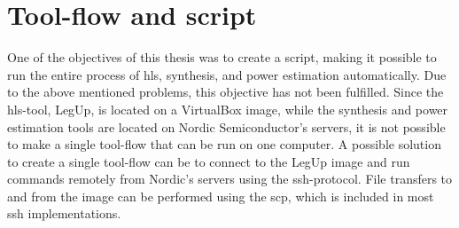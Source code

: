 \section{Tool-flow and script}
One of the objectives of this thesis was to create a script, making it possible to run the entire process of \gls{hls}, synthesis, and power estimation automatically. Due to the above mentioned problems, this objective has not been fulfilled. Since the \gls{hls}-tool, LegUp, is located on a VirtualBox image, while the synthesis and power estimation tools are located on Nordic Semiconductor's servers, it is not possible to make a single tool-flow that can be run on one computer. A possible solution to create a single tool-flow can be to connect to the LegUp image and run commands remotely from Nordic's servers using the \gls{ssh}-protocol. File transfers to and from the image can be performed using the \gls{scp}, which is included in most \gls{ssh} implementations.